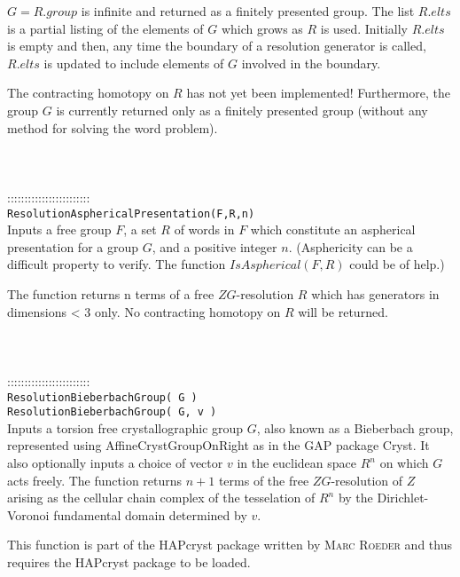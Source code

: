 \documentclass[a4paper,11pt]{report}
\begin{document}
{ $G=R.group$ is infinite and returned as a finitely presented group. The list $R.elts$ is a partial listing of the elements of $G$ which grows as $R$ is used. Initially $R.elts$ is empty and then, any time the boundary of a resolution generator is called, $R.elts$ is updated to include elements of $G$ involved in the boundary.

 The contracting homotopy on $R$ has not yet been implemented! Furthermore, the group $G$ is currently returned only as a finitely presented group (without any method
for solving the word problem). \\
 \\
 \\
 \\
 ::::::::::::::::::::::::\\
 \texttt{ResolutionAsphericalPresentation(F,R,n)}\\
 

 Inputs a free group $F$, a set $R$ of words in $F$ which constitute an aspherical presentation for a group $G$, and a positive integer $n$. (Asphericity can be a difficult property to verify. The function $IsAspherical(F,R)$ could be of help.)

 The function returns n terms of a free $ZG$-resolution $R$ which has generators in dimensions {\textless} 3 only. No contracting homotopy
on $R$ will be returned. \\
 \\
 \\
 \\
 ::::::::::::::::::::::::\\
 \texttt{ResolutionBieberbachGroup( G ) }\\
 \texttt{ResolutionBieberbachGroup( G, v ) }\\
 

 Inputs a torsion free crystallographic group $G$, also known as a Bieberbach group, represented using AffineCrystGroupOnRight
as in the GAP package Cryst. It also optionally inputs a choice of vector $v$ in the euclidean space $R^n$ on which $G$ acts freely. The function returns $n+1$ terms of the free $ZG$-resolution of $Z$ arising as the cellular chain complex of the tesselation of $R^n$ by the Dirichlet-Voronoi fundamental domain determined by $v$. 

 This function is part of the HAPcryst package written by \textsc{Marc Roeder} and thus requires the HAPcryst package to be loaded. 

}
\end{document}

